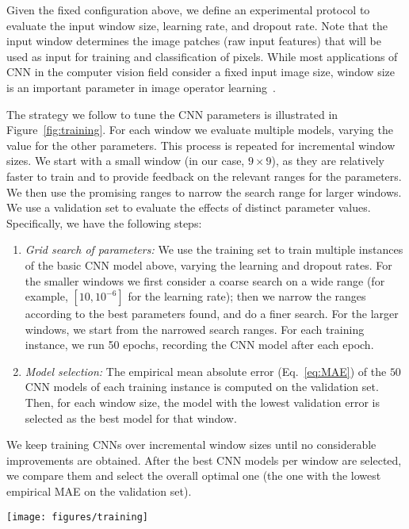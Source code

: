 \documentclass[conference]{IEEEtran}
\begin{document}
Given the fixed configuration above, we define an experimental
protocol to evaluate the input window size, learning rate, and dropout
rate. Note that the input window determines the image patches (raw
input features) that will be used as input for training and
classification of pixels. While most applications of CNN in the
computer vision field consider a fixed input image size, window size
is an important parameter in image operator learning~\cite{2009:Nina}.

The strategy we follow to tune the CNN parameters is illustrated in 
Figure~\ref{fig:training}. For each window we evaluate multiple
models, varying the value for the other parameters. This process is
repeated for incremental window sizes. We start with a small window
(in our case, $9\times 9$), as they are relatively faster
to train and to provide feedback on the relevant ranges for the
parameters. We then use the promising ranges to narrow the search
range for larger windows. We use a validation set to evaluate the
effects of distinct parameter values. Specifically, we have the
following steps:

\begin{enumerate}
\item \emph{Grid search of parameters:} We use the training set to
  train multiple instances of the basic CNN model above, varying the
  learning and dropout rates.
  For the smaller windows we first consider a coarse search on a wide
  range (for example, $[10, 10^{-6}]$ for the learning rate); then we
  narrow the ranges according to the best parameters found, and do a
  finer search. For the larger windows, we start from the narrowed
  search ranges. For each training instance, we run 50 epochs, 
  recording the CNN model after each epoch.

\item \emph{Model selection:} The empirical mean absolute error
  (Eq.~\ref{eq:MAE}) of the $50$ CNN models of each training instance
  is computed on the validation set. Then, for each window size, the
  model with the lowest validation error is selected as the best model
  for that window.
\end{enumerate}

We keep training CNNs over incremental window sizes until no
considerable improvements are obtained. After the best CNN models per
window are selected, we compare them and select the overall optimal
one (the one with the lowest empirical MAE on the validation set).

\begin{figure*}[htb]
\centering
\texttt{[image: figures/training]}
\caption{CNN training and parameters evaluation. The input window size
  determines the patch size. We train and evaluate multiple CNN models
  over incremental window sizes. At each evaluated window size, we use
  the optimal parameters from smaller windows to narrow the parameters
  range.}
\label{fig:training} 
\end{figure*}
\end{document}
